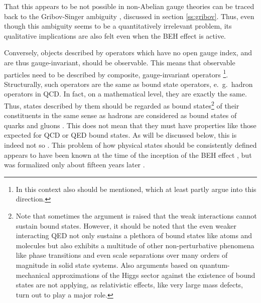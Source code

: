 \documentclass[final,12pt]{article}
\newcommand*{\1}{1\!\!\!\bot}
\begin{document}
That this appears to be not possible \cite{Haag:1992hx} in non-Abelian gauge theories can be traced back to the Gribov-Singer ambiguity \cite{Ilderton:2007qy,Lavelle:2011yc,Heinzl:2008bu}, discussed in section \ref{ss:gribov}. Thus, even though this ambiguity seems to be a quantitatively irrelevant problem, its qualitative implications are also felt even when the BEH effect is active.

Conversely, objects described by operators which have no open gauge index, and are thus gauge-invariant, should be observable. This means that observable particles need to be described by composite, gauge-invariant operators \cite{Banks:1979fi,Frohlich:1980gj,Frohlich:1981yi,Strocchi:2015uaa,Attard:2017sdn,Kondo:2018qus,DeWitt:2003pm,Karsch:1996aw,Philipsen:1996af,Philipsen:1997rq,Laine:1997nq,Maas:2012tj}\footnote{In this context also \cite{Lavelle:1994rh,Chernodub:2008rz,Faddeev:2008qc,Ilderton:2010tf} should be mentioned, which at least partly argue into this direction.}. Structurally, such operators are the same as bound state operators, e.\ g.\ hadron operators in QCD. In fact, on a mathematical level, they are exactly the same. Thus, states described by them should be regarded as bound states\footnote{Note that sometimes the argument is raised that the weak interactions cannot sustain bound states. However, it should be noted that the even weaker interacting QED not only sustains a plethora of bound states like atoms and molecules but also exhibits a multitude of other non-perturbative phenomena like phase transitions and even scale separations over many orders of magnitude in solid state systems. Also arguments based on quantum-mechanical approximations of the Higgs sector against the existence of bound states \cite{Grifols:1991gw} are not applying, as relativistic effects, like very large mass defects, turn out to play a major role.} of their constituents in the same sense as hadrons are considered as bound states of quarks and gluons \cite{Maas:2012tj}. This does not mean that they must have properties like those expected for QCD or QED bound states. As will be discussed below, this is indeed not so \cite{Frohlich:1980gj,Frohlich:1981yi,Maas:2012tj}. This problem of how physical states should be consistently defined appears to have been known at the time of the inception of the BEH effect \cite{Ivanov:pc,Strocchi:1977za,Englert:2004yk,Englert:2014zpa}, but was formalized only about fifteen years later \cite{Banks:1979fi,Frohlich:1980gj}.
\end{document}

